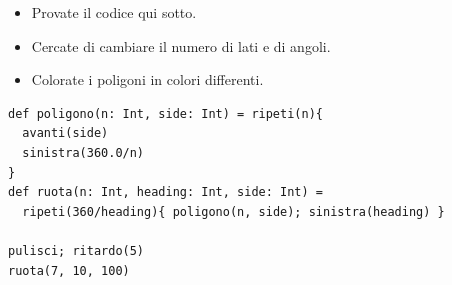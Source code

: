 \begin{itemize}

\item {Provate il codice qui sotto.}
\item {Cercate di cambiare il numero di lati e di angoli.}
\item {Colorate i poligoni in colori differenti.}

\end{itemize}



  

\begin{lstlisting}[basicstyle={\ttfamily\fontsize{16}{19}\selectfont},numbers=none]
def poligono(n: Int, side: Int) = ripeti(n){
  avanti(side)
  sinistra(360.0/n)
}
def ruota(n: Int, heading: Int, side: Int) = 
  ripeti(360/heading){ poligono(n, side); sinistra(heading) }

pulisci; ritardo(5)
ruota(7, 10, 100)
\end{lstlisting}
        
